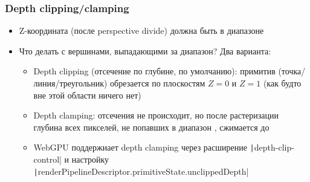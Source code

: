 \documentclass[10pt]{beamer}
\begin{document}
\begin{frame}[fragile]
\frametitle{Depth clipping/clamping}
\begin{itemize}
\item Z-координата (после perspective divide) должна быть в диапазоне \begin{math}[0, 1]\end{math}
\pause
\item Что делать с вершинами, выпадающими за диапазон? Два варианта:
\pause
\begin{itemize}
\item Depth clipping (отсечение по глубине, по умолчанию): примитив (точка/линия/треугольник) обрезается по плоскостям \begin{math}Z = 0\end{math} и \begin{math}Z = 1\end{math} (как будто вне этой области ничего нет)
\pause
\item Depth clamping: отсечения не происходит, но после растеризации глубина всех пикселей, не попавших в диапазон \begin{math}[0, 1]\end{math}, сжимается до \begin{math}[0, 1]\end{math}
\pause
\item WebGPU поддержиает depth clamping через расширение \texttt|depth-clip-control| и настройку \texttt|renderPipelineDescriptor.primitiveState.unclippedDepth|
\end{itemize}
\end{itemize}
\end{frame}
\end{document}

